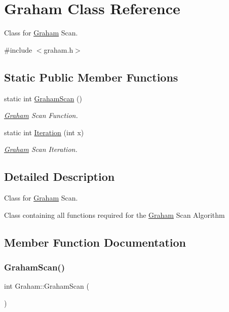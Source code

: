 \hypertarget{class_graham}{}\section{Graham Class Reference}
\label{class_graham}


Class for \mbox{\hyperlink{class_graham}{Graham}} Scan.  




{\ttfamily \#include $<$graham.\+h$>$}

\subsection*{Static Public Member Functions}
\begin{DoxyCompactItemize}
\item 
static int \mbox{\hyperlink{class_graham_aaa7c9fde00b0469384417bb6a6b20dc3}{Graham\+Scan}} ()
\begin{DoxyCompactList}\small\item\em \mbox{\hyperlink{class_graham}{Graham}} Scan Function. \end{DoxyCompactList}\item 
static int \mbox{\hyperlink{class_graham_a404c78e5ea03dfaf054fe33867e09119}{Iteration}} (int x)
\begin{DoxyCompactList}\small\item\em \mbox{\hyperlink{class_graham}{Graham}} Scan Iteration. \end{DoxyCompactList}\end{DoxyCompactItemize}


\subsection{Detailed Description}
Class for \mbox{\hyperlink{class_graham}{Graham}} Scan. 

Class containing all functions required for the \mbox{\hyperlink{class_graham}{Graham}} Scan Algorithm 

\subsection{Member Function Documentation}
\mbox{\label{class_graham_aaa7c9fde00b0469384417bb6a6b20dc3}} 
\subsubsection{\texorpdfstring{GrahamScan()}{GrahamScan()}}
{\footnotesize\ttfamily int Graham\+::\+Graham\+Scan (\begin{DoxyParamCaption}{ }\end{DoxyParamCaption})\hspace{0.3cm}{\ttfamily [static]}}



